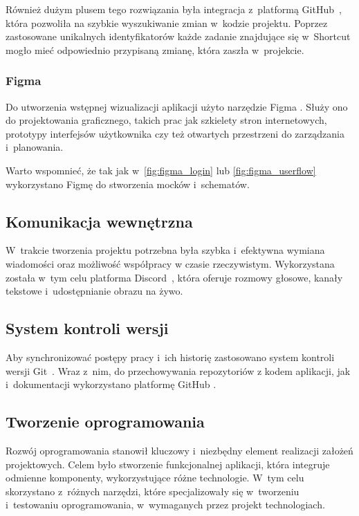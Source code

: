 \FloatBarrier

Również dużym plusem tego rozwiązania była integracja
z~platformą GitHub~\cite{Github}, która pozwoliła na
szybkie wyszukiwanie zmian w~kodzie projektu. Poprzez
zastosowane unikalnych identyfikatorów każde zadanie
znajdujące się w~Shortcut mogło mieć odpowiednio przypisaną
zmianę, która zaszła w~projekcie.


\subsubsection{Figma}

Do utworzenia wstępnej wizualizacji aplikacji użyto narzędzie Figma \cite{Figma}.
Służy ono do projektowania graficznego, takich prac jak szkielety stron
internetowych, prototypy interfejsów użytkownika czy też otwartych przestrzeni
do zarządzania i~planowania.

Warto wspomnieć, że tak jak w~\ref{fig:figma_login} lub
\ref{fig:figma_userflow} wykorzystano Figmę do stworzenia mocków i~schematów.

\FloatBarrier

\subsection{Komunikacja wewnętrzna}

W~trakcie tworzenia projektu potrzebna była szybka i~efektywna
wymiana wiadomości oraz możliwość współpracy w czasie rzeczywistym.
Wykorzystana została w~tym celu platforma Discord~\cite{Discord},
która oferuje rozmowy głosowe, kanały tekstowe i~udostępnianie
obrazu na żywo.


\subsection{System kontroli wersji}

Aby synchronizować postępy pracy i~ich historię zastosowano
system kontroli wersji Git~\cite{Git}. Wraz z~nim, do przechowywania
repozytoriów z kodem aplikacji, jak i~dokumentacji wykorzystano
platformę GitHub \cite{Github}.


\subsection{Tworzenie oprogramowania}

Rozwój oprogramowania stanowił kluczowy i~niezbędny element realizacji
założeń projektowych.
Celem było stworzenie funkcjonalnej aplikacji, która integruje
odmienne komponenty, wykorzystujące różne technologie.
W~tym celu skorzystano z~różnych narzędzi, które specjalizowały się
w~tworzeniu i~testowaniu oprogramowania, w~wymaganych przez projekt
technologiach.


